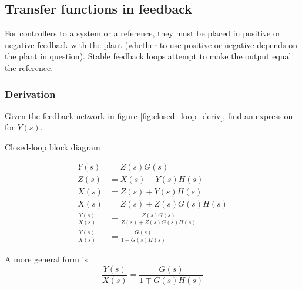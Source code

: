 \subsection{Transfer functions in feedback}

For \glspl{controller} to  a \gls{system} or
 a reference, they must be placed in positive or
negative feedback with the \gls{plant} (whether to use positive or negative
depends on the \gls{plant} in question). Stable feedback loops attempt to make
the \gls{output} equal the \gls{reference}.

\subsubsection{Derivation}

Given the feedback network in figure \ref{fig:closed_loop_deriv}, find an
expression for $Y(s)$.
\begin{bookfigure}

  \caption{Closed-loop block diagram}
  \label{fig:closed_loop_deriv}
\end{bookfigure}
\begin{align}
  Y(s) &= Z(s) G(s) \nonumber \\
  Z(s) &= X(s) - Y(s) H(s) \nonumber \\
  X(s) &= Z(s) + Y(s) H(s) \nonumber \\
  X(s) &= Z(s) + Z(s) G(s) H(s) \nonumber \\
  \frac{Y(s)}{X(s)} &= \frac{Z(s) G(s)}{Z(s) + Z(s) G(s) H(s)} \nonumber \\
  \frac{Y(s)}{X(s)} &= \frac{G(s)}{1 + G(s) H(s)}
\end{align}

A more general form is
\begin{equation}
  \frac{Y(s)}{X(s)} = \frac{G(s)}{1 \mp G(s) H(s)}
    \label{eq:tf_in_feedback}
\end{equation}

